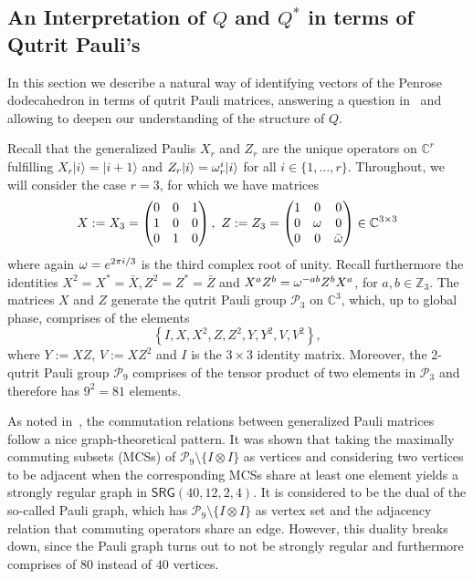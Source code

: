 \subsection{An Interpretation of $Q$ and $Q^*$ in terms of Qutrit Pauli's}
In this section we describe a natural way of identifying vectors
of the Penrose dodecahedron in terms of qutrit Pauli matrices,
answering a question in~\cite{Planat_2007} 
and allowing to deepen our understanding of the structure of $Q$.

Recall that the generalized Paulis $X_r$ and $Z_r$ are the
unique operators on $\mathbb{C}^r$ fulfilling
$X_r |i\rangle = |i + 1\rangle$ and $Z_r |i\rangle = \omega_r^i |i\rangle$ for all
$i \in \{1, \dots, r\}$. 
Throughout, we will consider the case $r = 3$, for which we have matrices
\[ X := X_3 = \begin{pmatrix}
    0 & 0 & 1 \\
    1 & 0 & 0 \\
    0 & 1 & 0 
\end{pmatrix},~Z := Z_3 = \begin{pmatrix}
    1 & 0 & 0 \\
    0 & \omega & 0 \\
    0 & 0 & \bar{\omega}
    
\end{pmatrix} \in \mathbb{C}^{3\times3} \]
where again $\omega = e^{2\pi i /3}$ is the third complex root of unity.
Recall furthermore the identities
$X^2 = X^* = \bar{X}, Z^2 = Z^* = \bar{Z}$ and $X^a Z^b = \omega^{-ab} Z^b X^a$, for $a,b \in \mathbb{Z}_3$.
The matrices $X$ and $Z$ generate the qutrit Pauli group $\mathcal{P}_3$ on $\mathbb{C}^3$,
which, up to global phase, comprises of the elements
\[ \left\{ I, X, X^2, Z, Z^2, Y, Y^2, V, V^2 \right\}, \]
where $Y := XZ$, $V := XZ^2$ and $I$ is the $3 \times 3$ identity matrix.
%
Moreover, the 2-qutrit Pauli group $\mathcal{P}_9$
comprises of the tensor product of two elements in $\mathcal{P}_3$
and therefore has $9^2 = 81$ elements.

As noted in~\cite{Planat_2007,planat:hal-00127731}, the commutation relations 
between generalized Pauli matrices follow a nice graph-theoretical pattern.
It was shown that taking the maximally commuting subsets (MCSs)
of $\mathcal{P}_9 \setminus \{ I \otimes I \}$ as vertices
and considering two vertices to
be adjacent when the corresponding MCSs share at least one element
yields a strongly regular graph in $\textsf{SRG}(40, 12, 2, 4)$.
It is considered to be the dual of the so-called Pauli graph,
which has $\mathcal{P}_9 \setminus \{ I \otimes I \}$ as vertex set and the adjacency relation 
that commuting operators share an edge. However,
this duality breaks down, since the Pauli graph
turns out to not be strongly regular and furthermore comprises of
$80$ instead of $40$ vertices.

